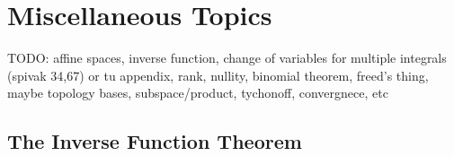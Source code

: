 \section{Miscellaneous Topics}
TODO: affine spaces, inverse function, change of variables for multiple integrals (spivak 34,67) or tu appendix, rank, nullity, binomial theorem, freed's thing, maybe topology bases, subspace/product, tychonoff, convergnece, etc
\subsection{The Inverse Function Theorem}


